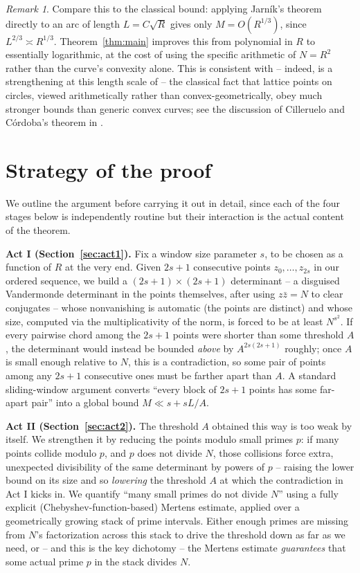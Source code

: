\documentclass[11pt]{amsart}
\theoremstyle{definition}
\theoremstyle{remark}
\newtheorem{remark}[theorem]{Remark}
\begin{document}
\begin{remark}
Compare this to the classical bound: applying Jarn\'{i}k's theorem directly to an arc of length $L=C\sqrt R$ gives only $M = O(R^{1/3})$, since $L^{2/3} \asymp R^{1/3}$. Theorem~\ref{thm:main} improves this from polynomial in $R$ to essentially logarithmic, at the cost of using the specific arithmetic of $N=R^2$ rather than the curve's convexity alone. This is consistent with -- indeed, is a strengthening at this length scale of -- the classical fact that lattice points on circles, viewed arithmetically rather than convex-geometrically, obey much stronger bounds than generic convex curves; see the discussion of Cilleruelo and C\'{o}rdoba's theorem in \cite{Chen2021}.
\end{remark}

\section{Strategy of the proof}\label{sec:strategy}

We outline the argument before carrying it out in detail, since each of the four stages below is independently routine but their interaction is the actual content of the theorem.

\textbf{Act I (Section~\ref{sec:act1}).} Fix a window size parameter $s$, to be chosen as a function of $R$ at the very end. Given $2s+1$ consecutive points $z_0,\dots,z_{2s}$ in our ordered sequence, we build a $(2s+1)\times(2s+1)$ determinant -- a disguised Vandermonde determinant in the points themselves, after using $z\bar z = N$ to clear conjugates -- whose nonvanishing is automatic (the points are distinct) and whose size, computed via the multiplicativity of the norm, is forced to be at least $N^{s^2}$. If every pairwise chord among the $2s+1$ points were shorter than some threshold $A$, the determinant would instead be bounded \emph{above} by $A^{2s(2s+1)}$ roughly; once $A$ is small enough relative to $N$, this is a contradiction, so some pair of points among any $2s+1$ consecutive ones must be farther apart than $A$. A standard sliding-window argument converts ``every block of $2s+1$ points has some far-apart pair'' into a global bound $M \ll s + sL/A$.

\textbf{Act II (Section~\ref{sec:act2}).} The threshold $A$ obtained this way is too weak by itself. We strengthen it by reducing the points modulo small primes $p$: if many points collide modulo $p$, and $p$ does not divide $N$, those collisions force extra, unexpected divisibility of the same determinant by powers of $p$ -- raising the lower bound on its size and so \emph{lowering} the threshold $A$ at which the contradiction in Act I kicks in. We quantify ``many small primes do not divide $N$'' using a fully explicit (Chebyshev-function-based) Mertens estimate, applied over a geometrically growing stack of prime intervals. Either enough primes are missing from $N$'s factorization across this stack to drive the threshold down as far as we need, or -- and this is the key dichotomy -- the Mertens estimate \emph{guarantees} that some actual prime $p$ in the stack divides $N$.
\end{document}
